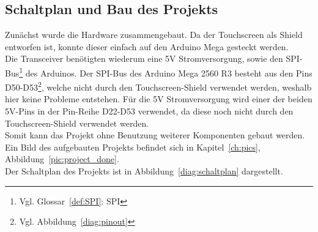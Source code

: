\documentclass[a4paper, 11pt]{scrartcl}
\begin{document}
\subsection{Schaltplan und Bau des Projekts}
Zunächst wurde die Hardware zusammengebaut. Da der Touchscreen als Shield entworfen ist, konnte dieser einfach auf den Arduino Mega gesteckt werden.
\\
Die Transceiver benötigten wiederum eine 5V Stromversorgung, sowie den SPI-Bus\footnote{Vgl. Glossar~\ref{def:SPI}: SPI} des Arduinos. Der SPI-Bus des Arduino Mega
2560 R3 besteht aus den Pins D50-D53\footnote{Vgl. Abbildung~\ref{diag:pinout}}, welche nicht durch den Touchscreen-Shield verwendet werden, weshalb hier keine Probleme
entstehen. Für die 5V Stromversorgung wird einer der beiden 5V-Pins in der Pin-Reihe D22-D53 verwendet, da diese noch nicht durch den Touchscreen-Shield verwendet werden.
\\
Somit kann das Projekt ohne Benutzung weiterer Komponenten gebaut werden. Ein Bild des aufgebauten Projekts befindet sich in Kapitel~\ref{ch:pics}, Abbildung~\ref{pic:project_done}.
\\
Der Schaltplan des Projekts ist in Abbildung~\ref{diag:schaltplan} dargestellt.
\end{document}
